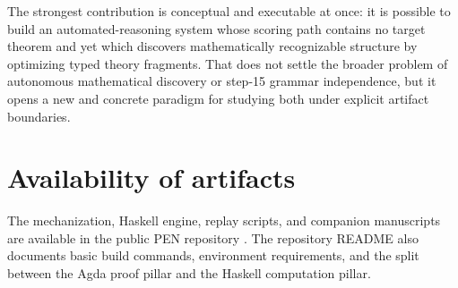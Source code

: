 \documentclass[pdflatex,sn-mathphys,Numbered]{sn-jnl}
\theoremstyle{thmstyleone}
\theoremstyle{thmstylethree}
\theoremstyle{thmstyletwo}
\begin{document}
The strongest contribution is conceptual and executable at once: it is possible to build an automated-reasoning system whose scoring path contains no target theorem and yet which discovers mathematically recognizable structure by optimizing typed theory fragments. That does not settle the broader problem of autonomous mathematical discovery or step-15 grammar independence, but it opens a new and concrete paradigm for studying both under explicit artifact boundaries.

\clearpage

\section*{Availability of artifacts}

The mechanization, Haskell engine, replay scripts, and companion manuscripts are available in the public PEN repository \cite{pen-artifact}. The repository README also documents basic build commands, environment requirements, and the split between the Agda proof pillar and the Haskell computation pillar.


\end{document}
